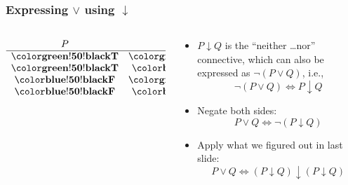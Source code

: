 \begin{frame}
    \frametitle{Expressing $\lor$ using $\downarrow$}

\begin{columns}
\begin{column}{3cm}
\[\begin{array}{cc|c}
P & Q & (P \downarrow Q)\\
\hline
\True & \True & \False\\
\True & \False & \False\\
\False & \True & \False\\
\False & \False & \True
\end{array}\]
\end{column}
\begin{column}{7cm}
\begin{itemize}[<+->]
\item $P \downarrow Q$ is the ``neither \dots nor'' connective, which can also
be expressed as $\lnot(P \lor Q)$, i.e.,
\[ \lnot(P \lor Q) \Leftrightarrow P \downarrow Q \]
\item Negate both sides:
\[
P \lor Q \Leftrightarrow \lnot(P \downarrow Q)
\]
\item Apply what we figured out in last slide:
\[
P \lor Q \Leftrightarrow (P \downarrow Q)\downarrow(P \downarrow Q)
\]
\end{itemize}
\end{column}
\end{columns}

\end{frame}

